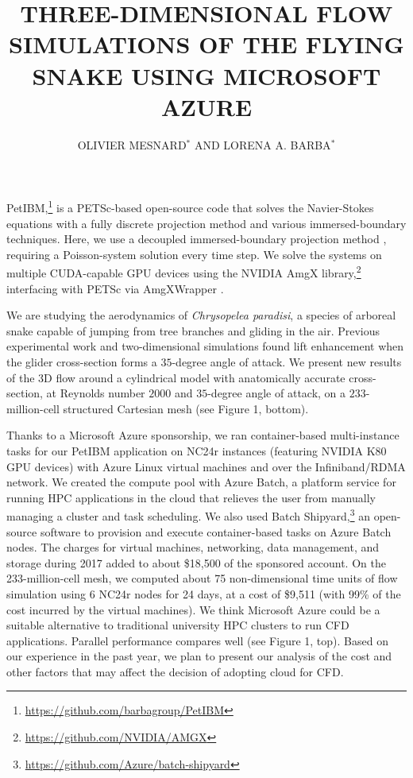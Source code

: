 \documentclass{parcfd2018}
\title{THREE-DIMENSIONAL FLOW SIMULATIONS OF THE FLYING SNAKE USING MICROSOFT AZURE}
\author{OLIVIER MESNARD$^{*}$ AND LORENA A. BARBA$^{*}$}
\begin{document}

PetIBM,\footnote{\url{https://github.com/barbagroup/PetIBM}} is a PETSc-based open-source code that solves the Navier-Stokes equations with a fully discrete projection method and various immersed-boundary techniques.
Here, we use a decoupled immersed-boundary projection method \cite{Li_et_al_2016}, requiring a Poisson-system solution every time step.
We solve the systems on multiple CUDA-capable GPU devices using the NVIDIA AmgX library,\footnote{\url{https://github.com/NVIDIA/AMGX}} interfacing with PETSc via AmgXWrapper \cite{AmgXWrapper}.

We are studying the aerodynamics of \textit{Chrysopelea paradisi}, a species of arboreal snake capable of jumping from tree branches and gliding in the air.
Previous experimental work \cite{Holden_et_al_2014} and two-dimensional simulations \cite{Krishnan_et_al_2014, Mesnard_Barba_2017} found lift enhancement when the glider cross-section forms a $35$-degree angle of attack.
We present new results of the 3D flow around a cylindrical model with anatomically accurate cross-section, at Reynolds number $2000$ and $35$-degree angle of attack, on a  $233$-million-cell structured Cartesian mesh (see Figure 1, bottom).

Thanks to a Microsoft Azure sponsorship, we ran container-based multi-instance tasks for our PetIBM application on NC24r instances (featuring NVIDIA K80 GPU devices) with Azure Linux virtual machines and over the Infiniband/RDMA network.
We created the compute pool with Azure Batch, a platform service for running HPC applications in the cloud that relieves the user from manually managing a cluster and task scheduling.
We also used Batch Shipyard,\footnote{\url{https://github.com/Azure/batch-shipyard}} an open-source software to provision and execute container-based tasks on Azure Batch nodes.
The charges for virtual machines, networking, data management, and storage during 2017 added to about \$18,500 of the sponsored account.
On the 233-million-cell mesh, we computed about 75 non-dimensional time units of flow simulation using 6 NC24r nodes for 24 days, at a cost of \$9,511 (with 99\% of the cost incurred by the virtual machines).
We think Microsoft Azure could be a suitable alternative to traditional university HPC clusters to run CFD applications.
Parallel performance compares well (see Figure 1, top).
Based on our experience in the past year, we plan to present our analysis of the cost and other factors that may affect the decision of adopting cloud for CFD.
\end{document}
